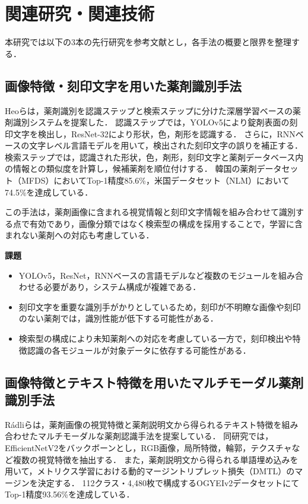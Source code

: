 \documentclass{jsarticle}
\begin{document}
\newpage

\section{関連研究・関連技術}\label{sec2}

本研究では以下の3本の先行研究を参考文献とし，各手法の概要と限界を整理する．

\subsection{画像特徴・刻印文字を用いた薬剤識別手法}

Heoら\cite{heo2023pill}は，薬剤識別を認識ステップと検索ステップに分けた深層学習ベースの薬剤識別システムを提案した．
認識ステップでは，YOLOv5により錠剤表面の刻印文字を検出し，ResNet-32により形状，色，剤形を認識する．
さらに，RNNベースの文字レベル言語モデルを用いて，検出された刻印文字の誤りを補正する．
検索ステップでは，認識された形状，色，剤形，刻印文字と薬剤データベース内の情報との類似度を計算し，候補薬剤を順位付けする．
韓国の薬剤データセット（MFDS）においてTop-1精度85.6\%，米国データセット（NLM）において74.5\%を達成している．

この手法は，薬剤画像に含まれる視覚情報と刻印文字情報を組み合わせて識別する点で有効であり，画像分類ではなく検索型の構成を採用することで，学習に含まれない薬剤への対応も考慮している．

\textbf{課題}
\begin{itemize}
  \item YOLOv5，ResNet，RNNベースの言語モデルなど複数のモジュールを組み合わせる必要があり，システム構成が複雑である．
  \item 刻印文字を重要な識別手がかりとしているため，刻印が不明瞭な画像や刻印のない薬剤では，識別性能が低下する可能性がある．
  \item 検索型の構成により未知薬剤への対応を考慮している一方で，刻印検出や特徴認識の各モジュールが対象データに依存する可能性がある．
\end{itemize}

\subsection{画像特徴とテキスト特徴を用いたマルチモーダル薬剤識別手法}

Rádliら\cite{radli2024metric}は，薬剤画像の視覚特徴と薬剤説明文から得られるテキスト特徴を組み合わせたマルチモーダルな薬剤認識手法を提案している．
同研究では，EfficientNetV2をバックボーンとし，RGB画像，局所特徴，輪郭，テクスチャなど複数の視覚特徴を抽出する．
また，薬剤説明文から得られる単語埋め込みを用いて，メトリクス学習における動的マージントリプレット損失（DMTL）のマージンを決定する．
112クラス・4,480枚で構成するOGYEIv2データセットにてTop-1精度93.56\%を達成している．
\end{document}
